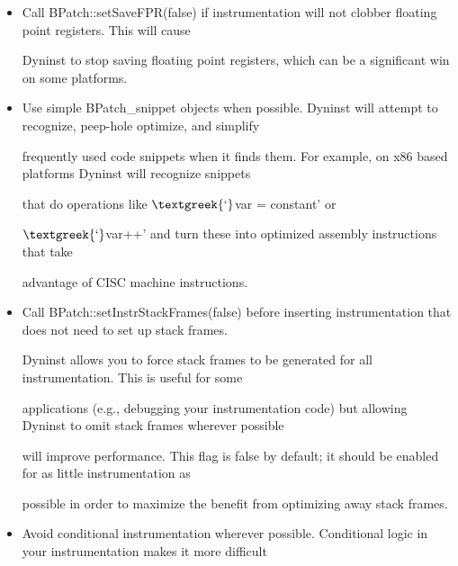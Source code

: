 {{{\begin{itemize}
{function call, but will not execute recursively, then enable trampoline recursion. This will cause Dyninst to stop

generating a trampoline guard and thread index calculation on all future pieces of instrumentation. An example of

instrumentation recursion would be instrumenting a call to write with instrumentation that calls

printf$\text{\textgreek{—}}$write will start calling printf printf will re-call write.}

\item {

Call BPatch::setSaveFPR(false) if instrumentation will not clobber floating point registers. This will cause

Dyninst to stop saving floating point registers, which can be a significant win on some platforms.}

\item {

Use simple BPatch_snippet objects when possible. Dyninst will attempt to recognize, peep-hole optimize, and simplify

frequently used code snippets when it finds them. For example, on x86 based platforms Dyninst will recognize snippets

that do operations like $\text{\textgreek{‘}}$var = constant' or

$\text{\textgreek{‘}}$var++' and turn these into optimized assembly instructions that take

advantage of CISC machine instructions.}

\item {

Call BPatch::setInstrStackFrames(false) before inserting instrumentation that does not need to set up stack frames.

Dyninst allows you to force stack frames to be generated for all instrumentation. This is useful for some

applications (e.g., debugging your instrumentation code) but allowing Dyninst to omit stack frames wherever possible

will improve performance. This flag is false by default; it should be enabled for as little instrumentation as

possible in order to maximize the benefit from optimizing away stack frames.}

\item {

Avoid conditional instrumentation wherever possible. Conditional logic in your instrumentation makes it more difficult

}
\end{itemize}}}}

